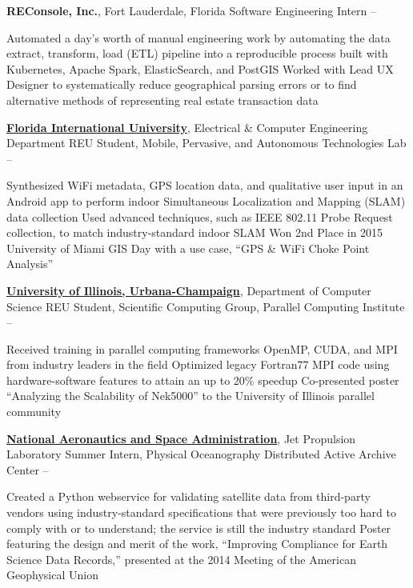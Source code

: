 \documentclass[letterpaper,MMMyyyy,nonstopmode]{simpleresumecv}
\begin{document}
\begin{Body}
\Entry
\textbf{REConsole, Inc.}, Fort Lauderdale, Florida
\Gap
\BulletItem
Software Engineering Intern
\hfill
{} -- 
\begin{Detail}
\SubBulletItem Automated a day's worth of manual engineering work by automating the data extract, transform, load (ETL) pipeline into a reproducible process built with Kubernetes, Apache Spark, ElasticSearch, and PostGIS
\SubBulletItem Worked with Lead UX Designer to systematically reduce geographical parsing errors or to find alternative methods of representing real estate transaction data
\end{Detail}

\Entry
\href{http://www.fiu.edu/}{\textbf{Florida International University}}, Electrical \& Computer Engineering Department
\Gap
\BulletItem REU Student, Mobile, Pervasive, and Autonomous Technologies Lab
\hfill {} -- 
\begin{Detail}
\SubBulletItem Synthesized WiFi metadata, GPS location data, and qualitative user input in an Android app to perform indoor Simultaneous Localization and Mapping (SLAM) data collection
\SubBulletItem Used advanced techniques, such as IEEE 802.11 Probe Request collection, to match industry-standard indoor SLAM
\SubBulletItem Won 2nd Place in 2015 University of Miami GIS Day with a use case, ``GPS \& WiFi Choke Point Analysis''
\end{Detail}

\Entry
\href{http://illinois.edu/}{\textbf{University of Illinois, Urbana-Champaign}}, Department of Computer Science
\Gap
\BulletItem REU Student, Scientific Computing Group, Parallel Computing Institute
\hfill {} -- 
\begin{Detail}
\SubBulletItem Received training in parallel computing frameworks OpenMP, CUDA, and MPI from industry leaders in the field
\SubBulletItem Optimized legacy Fortran77 MPI code using hardware-software features to attain an up to 20\% speedup
\SubBulletItem Co-presented poster ``Analyzing the Scalability of Nek5000'' to the University of Illinois parallel community
\end{Detail}

\Entry
\href{http://www.jpl.nasa.gov/}{\textbf{National Aeronautics and Space Administration}}, Jet Propulsion Laboratory
\Gap
\BulletItem Summer Intern, Physical Oceanography Distributed Active Archive Center
\hfill
{} -- 
\begin{Detail}
\SubBulletItem Created a Python webservice for validating satellite data from third-party vendors using industry-standard specifications that were previously too hard to comply with or to understand; the service is still the industry standard
\SubBulletItem Poster featuring the design and merit of the work, ``Improving Compliance for Earth Science Data Records,'' presented at the 2014 Meeting of the American Geophysical Union
\end{Detail}


\end{Body}
\end{document}
